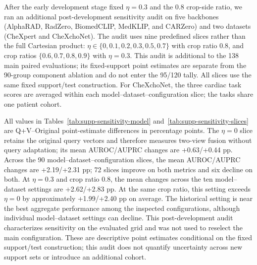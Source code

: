 After the early development stage fixed $\eta=0.3$ and the 0.8 crop-side ratio, we ran an additional post-development sensitivity audit on five backbones (AlphaRAD, RadZero, BiomedCLIP, MedKLIP, and CARZero) and two datasets (CheXpert and CheXchoNet). The audit uses nine predefined slices rather than the full Cartesian product: $\eta\in\{0,0.1,0.2,0.3,0.5,0.7\}$ with crop ratio 0.8, and crop ratios $\{0.6,0.7,0.8,0.9\}$ with $\eta=0.3$. This audit is additional to the 138 main paired evaluations; its fixed-support point estimates are separate from the 90-group component ablation and do not enter the 95/120 tally. All slices use the same fixed support/test construction. For CheXchoNet, the three cardiac task scores are averaged within each model--dataset--configuration slice; the tasks share one patient cohort.

All values in Tables~\ref{tab:supp-sensitivity-model} and~\ref{tab:supp-sensitivity-slices} are Q+V--Original point-estimate differences in percentage points. The $\eta=0$ slice retains the original query vectors and therefore measures two-view fusion without query adaptation; its mean AUROC/AUPRC changes are +0.63/+0.44 pp. Across the 90 model--dataset--configuration slices, the mean AUROC/AUPRC changes are +2.19/+2.31 pp; 72 slices improve on both metrics and six decline on both. At $\eta=0.3$ and crop ratio 0.8, the mean changes across the ten model--dataset settings are +2.62/+2.83 pp. At the same crop ratio, this setting exceeds $\eta=0$ by approximately +1.99/+2.40 pp on average. The historical setting is near the best aggregate performance among the inspected configurations, although individual model--dataset settings can decline. This post-development audit characterizes sensitivity on the evaluated grid and was not used to reselect the main configuration. These are descriptive point estimates conditional on the fixed support/test construction; this audit does not quantify uncertainty across new support sets or introduce an additional cohort.



